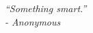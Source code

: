 
\begin{table}
  \begin{flushright}
	\large{\emph{``Something smart.'' \\- Anonymous}}  
\end{flushright}
\end{table}

